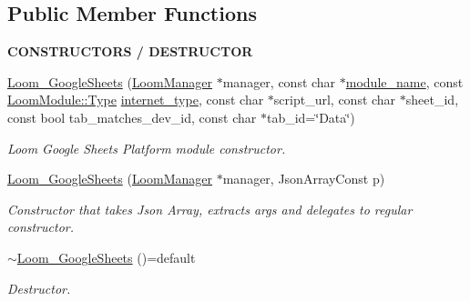 \subsection*{Public Member Functions}
\begin{Indent}{\bf C\+O\+N\+S\+T\+R\+U\+C\+T\+O\+RS / D\+E\+S\+T\+R\+U\+C\+T\+OR}\par
\begin{DoxyCompactItemize}
\item 
\hyperlink{class_loom___google_sheets_abe3f15347cdb097a36d761a0764a1f3b}{Loom\+\_\+\+Google\+Sheets} (\hyperlink{class_loom_manager}{Loom\+Manager} $\ast$manager, const char $\ast$\hyperlink{class_loom_module_adf6e68ad7e9fa2acfca7a8a280680764}{module\+\_\+name}, const \hyperlink{class_loom_module_aee91d0a75140d51ee428fc2d4417d865}{Loom\+Module\+::\+Type} \hyperlink{class_loom_publish_plat_aab697868e61843787893f5509d22b9ed}{internet\+\_\+type}, const char $\ast$script\+\_\+url, const char $\ast$sheet\+\_\+id, const bool tab\+\_\+matches\+\_\+dev\+\_\+id, const char $\ast$tab\+\_\+id=\char`\"{}Data\char`\"{})
\begin{DoxyCompactList}\small\item\em Loom Google Sheets Platform module constructor. \end{DoxyCompactList}\item 
\hyperlink{class_loom___google_sheets_afbf17bbfb3bd62bfd8e79a107e8caf3b}{Loom\+\_\+\+Google\+Sheets} (\hyperlink{class_loom_manager}{Loom\+Manager} $\ast$manager, Json\+Array\+Const p)
\begin{DoxyCompactList}\small\item\em Constructor that takes Json Array, extracts args and delegates to regular constructor. \end{DoxyCompactList}\item 
\hyperlink{class_loom___google_sheets_a2d9b1d435c045e0dc4d9a889daef0e4a}{$\sim$\+Loom\+\_\+\+Google\+Sheets} ()=default
\begin{DoxyCompactList}\small\item\em Destructor. \end{DoxyCompactList}\end{DoxyCompactItemize}
\end{Indent}
